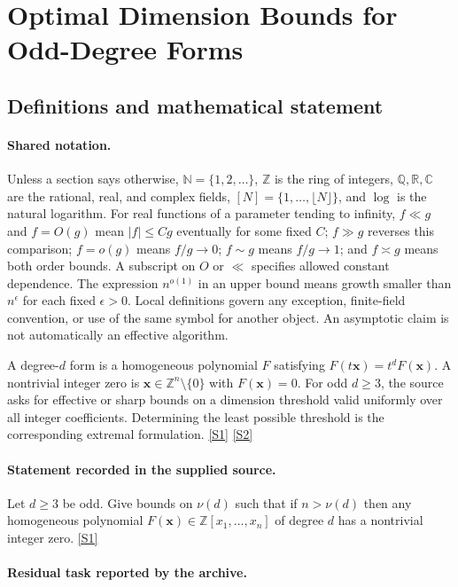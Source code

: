 \documentclass[11pt,a4paper]{article}
\newcommand{\N}{\mathbb{N}}
\newcommand{\Z}{\mathbb{Z}}
\newcommand{\Q}{\mathbb{Q}}
\newcommand{\R}{\mathbb{R}}
\newcommand{\C}{\mathbb{C}}
\newcommand{\sref}[2]{\hyperlink{source:#1:#2}{[S#2]}}
\begin{document}
\section{Optimal Dimension Bounds for Odd-Degree Forms}\label{statement}


\subsection{Definitions and mathematical statement}

\paragraph{Shared notation.}Unless a section says otherwise, $\N=\{1,2,\ldots\}$,
$\Z$ is the ring of integers, $\Q,\R,\C$ are the rational, real, and complex
fields, $[N]=\{1,\ldots,\lfloor N\rfloor\}$, and $\log$ is the natural
logarithm. For real functions of a parameter tending to infinity,
$f\ll g$ and $f=O(g)$ mean $|f|\leq Cg$ eventually for some fixed $C$;
$f\gg g$ reverses this comparison; $f=o(g)$ means $f/g\to0$;
$f\sim g$ means $f/g\to1$; and $f\asymp g$ means both order bounds.
A subscript on $O$ or $\ll$ specifies allowed constant dependence.
The expression $n^{o(1)}$ in an upper bound means growth smaller than
$n^\epsilon$ for each fixed $\epsilon>0$. Local definitions govern any
exception, finite-field convention, or use of the same symbol for another
object. An asymptotic claim is not automatically an effective algorithm.



A degree-$d$ form is a homogeneous polynomial $F$ satisfying $F(t\mathbf x)=t^dF(\mathbf x)$. A nontrivial integer zero is $\mathbf x\in\Z^n\setminus\{0\}$ with $F(\mathbf x)=0$. For odd $d\geq3$, the source asks for effective or sharp bounds on a dimension threshold valid uniformly over all integer coefficients. Determining the least possible threshold is the corresponding extremal formulation. \sref{statement}{1} \sref{statement}{2}

\paragraph{Statement recorded in the supplied source.}
Let $d \geq 3$ be odd. Give bounds on $\nu(d)$ such that if $n > \nu(d)$ then any homogeneous polynomial $F(\mathbf{x}) \in \mathbb{Z}[x_1, \dots, x_n]$ of degree $d$ has a nontrivial integer zero. \sref{statement}{1}

\paragraph{Residual task reported by the archive.}
\end{document}
